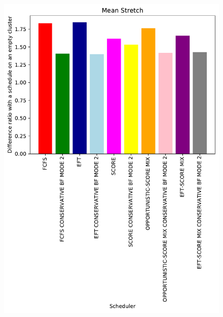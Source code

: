 \documentclass[a4paper]{article}
\begin{document}
\begin{figure}\includegraphics[width=0.9\linewidth]{MBSS/plot/Results_FCFS_Score_Backfill_2022-02-02->2022-02-03_V10000_Mean_Stretch_450_128_32_256_4_1024.pdf}\caption{}\end{figure}
\end{document}
